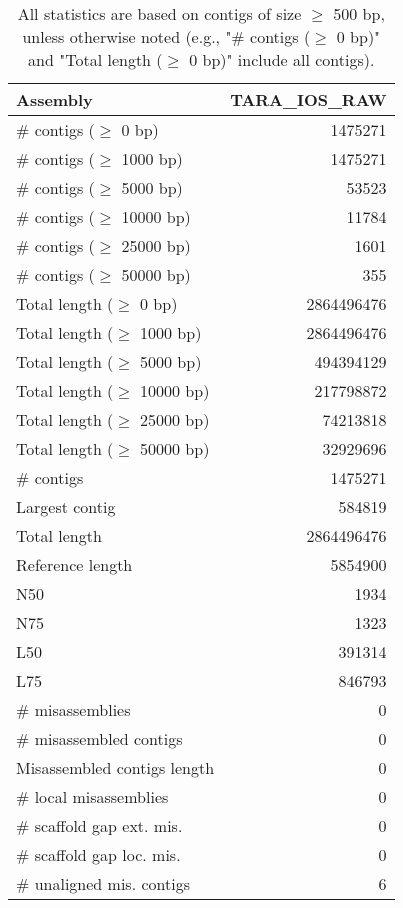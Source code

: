 \documentclass[12pt,a4paper]{article}
\begin{document}
\begin{table}[ht]
\begin{center}
\caption{All statistics are based on contigs of size $\geq$ 500 bp, unless otherwise noted (e.g., "\# contigs ($\geq$ 0 bp)" and "Total length ($\geq$ 0 bp)" include all contigs).}
\begin{tabular}{|l*{1}{|r}|}
\hline
Assembly & TARA\_IOS\_RAW \\ \hline
\# contigs ($\geq$ 0 bp) & 1475271 \\ \hline
\# contigs ($\geq$ 1000 bp) & 1475271 \\ \hline
\# contigs ($\geq$ 5000 bp) & 53523 \\ \hline
\# contigs ($\geq$ 10000 bp) & 11784 \\ \hline
\# contigs ($\geq$ 25000 bp) & 1601 \\ \hline
\# contigs ($\geq$ 50000 bp) & 355 \\ \hline
Total length ($\geq$ 0 bp) & 2864496476 \\ \hline
Total length ($\geq$ 1000 bp) & 2864496476 \\ \hline
Total length ($\geq$ 5000 bp) & 494394129 \\ \hline
Total length ($\geq$ 10000 bp) & 217798872 \\ \hline
Total length ($\geq$ 25000 bp) & 74213818 \\ \hline
Total length ($\geq$ 50000 bp) & 32929696 \\ \hline
\# contigs & 1475271 \\ \hline
Largest contig & 584819 \\ \hline
Total length & 2864496476 \\ \hline
Reference length & 5854900 \\ \hline
N50 & 1934 \\ \hline
N75 & 1323 \\ \hline
L50 & 391314 \\ \hline
L75 & 846793 \\ \hline
\# misassemblies & 0 \\ \hline
\# misassembled contigs & 0 \\ \hline
Misassembled contigs length & 0 \\ \hline
\# local misassemblies & 0 \\ \hline
\# scaffold gap ext. mis. & 0 \\ \hline
\# scaffold gap loc. mis. & 0 \\ \hline
\# unaligned mis. contigs & 6 \\ \hline

\end{tabular}
\end{center}
\end{table}
\end{document}
